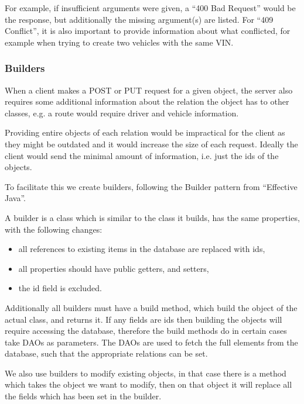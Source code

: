 For example, if insufficient arguments were given, a ``400 Bad Request'' would be the response,
but additionally the missing argument(s) are listed.
For ``409 Conflict'', it is also important to provide information about what conflicted,
for example when trying to create two vehicles with the same VIN.

\subsubsection{Builders}\label{par:builders}
When a client makes a POST or PUT request for a given object, 
the server also requires some additional information about the relation the object has to other classes, 
e.g. a route would require driver and vehicle information.

Providing entire objects of each relation would be impractical for the client as they might be outdated and it would increase the size of each request.
Ideally the client would send the minimal amount of information, i.e. just the ids of the objects.

To facilitate this we create builders, following the Builder pattern from ``Effective Java''\cite{Bloch:2008:EJ:1377533}. %

\bigskip
A builder is a class which is similar to the class it builds, has the same properties, with the following changes:
\begin{itemize}
    \item all references to existing items in the database are replaced with ids,
    \item all properties should have public getters, and setters,
    \item the id field is excluded.
\end{itemize}

Additionally all builders must have a build method, which build the object of the actual class, and returns it.
If any fields are ids then building the objects will require accessing the database,
therefore the build methods do in certain cases take \acp{DAO} as parameters.
The \acp{DAO} are used to fetch the full elements from the database, 
such that the appropriate relations can be set.

We also use builders to modify existing objects,
in that case there is a method which takes the object we want to modify,
then on that object it will replace all the fields which has been set in the builder.

